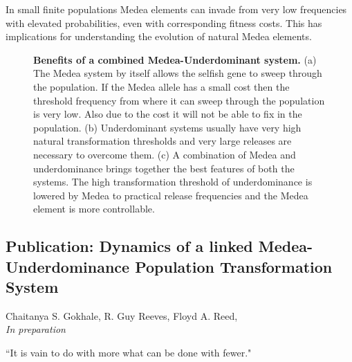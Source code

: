 \documentclass[oneside,11pt,a4paper]{book}
\begin{document}
In small finite populations Medea elements can invade from very low frequencies with elevated probabilities, even with corresponding fitness costs.
This has implications for understanding the evolution of natural Medea elements.
%
\begin{figure}[h]
  \begin{center}
    \leavevmode
    \caption{\textbf{Benefits of a combined Medea-Underdominant system.}
\small{(a) The Medea system by itself allows the selfish gene to sweep through the population.
If the Medea allele has a small cost then the threshold frequency from where it can sweep through the population is very low.
Also due to the cost it will not be able to fix in the population.
(b) Underdominant systems usually have very high natural transformation thresholds and very large releases are necessary to overcome them.
(c) A combination of Medea and underdominance brings together the best features of both the systems.
The high transformation threshold of underdominance is lowered by Medea to practical release frequencies and the Medea element is more controllable.}
}
    \label{fig:medeaUD}
  \end{center}
\end{figure}
%

\subsection{Publication: Dynamics of a linked Medea-Underdominance Population Transformation System}

Chaitanya S. Gokhale, R. Guy Reeves, Floyd A. Reed,\\
\textit{In preparation}




\begin{savequote}[10pc]
\sffamily
``It is vain to do with more what can be done with fewer."
\end{savequote}
\end{document}
